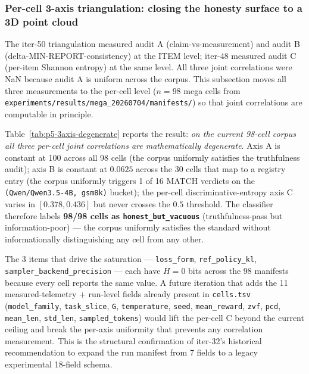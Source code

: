 \documentclass{article}  \usepackage[preprint,nonatbib]{neurips_2026} \usepackage[numbers]{natbib}
\providecommand{\tableref}[1]{Table~\ref{#1}}
\begin{document}
\subsubsection{Per-cell 3-axis triangulation: closing the honesty surface
to a 3D point cloud}
\label{sec:p5-3axis-per-cell}

The iter-50 triangulation measured audit A (claim-vs-measurement) and
audit B (delta-MIN-REPORT-consistency) at the ITEM level; iter-48
measured audit C (per-item Shannon entropy) at the same level. All
three joint correlations were NaN because audit A is uniform across
the corpus. This subsection moves all three measurements to the
per-cell level ($n{=}98$ mega cells from
\texttt{experiments/results/mega\_20260704/manifests/}) so that joint
correlations are computable in principle.

\tableref{tab:p5-3axis-degenerate} reports the result: \emph{on the
current 98-cell corpus all three per-cell joint correlations are
mathematically degenerate}. Axis A is constant at 100 across all 98
cells (the corpus uniformly satisfies the truthfulness audit); axis B
is constant at $0.0625$ across the 30 cells that map to a registry
entry (the corpus uniformly triggers 1 of 16 MATCH verdicts on the
\texttt{(Qwen/Qwen3.5-4B, gsm8k)} bucket); the per-cell
discriminative-entropy axis C varies in $[0.378, 0.436]$ but never
crosses the $0.5$ threshold. The classifier therefore labels
\textbf{98/98 cells as \texttt{honest\_but\_vacuous}} (truthfulness-pass
but information-poor) --- the corpus uniformly satisfies the standard
without informationally distinguishing any cell from any other.

The 3 items that drive the saturation --- \texttt{loss\_form},
\texttt{ref\_policy\_kl}, \texttt{sampler\_backend\_precision} ---
each have $H{=}0$ bits across the 98 manifests because every cell
reports the same value. A future iteration that adds the 11
measured-telemetry + run-level fields already present in
\texttt{cells.tsv} (\texttt{model\_family}, \texttt{task\_slice},
\texttt{G}, \texttt{temperature}, \texttt{seed}, \texttt{mean\_reward},
\texttt{zvf}, \texttt{pcd}, \texttt{mean\_len}, \texttt{std\_len},
\texttt{sampled\_tokens}) would lift the per-cell C beyond the
current ceiling and break the per-axis uniformity that prevents any
correlation measurement. This is the structural confirmation of
iter-32's historical recommendation to expand the run manifest from 7 fields
to a legacy experimental 18-field schema.
\end{document}
